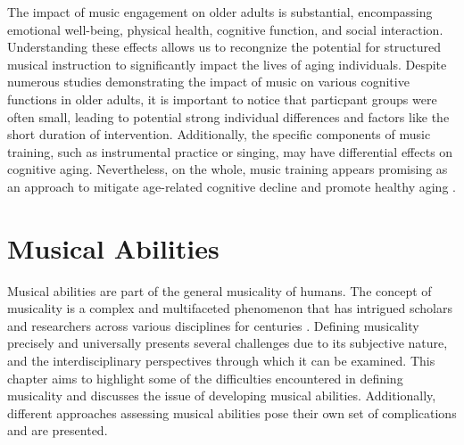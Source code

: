The impact of music engagement on older adults is substantial, encompassing emotional well-being, physical health, cognitive function, and social interaction. Understanding these effects allows us to recongnize the potential for structured musical instruction to significantly impact the lives of aging individuals. Despite numerous studies demonstrating the impact of music on various cognitive functions in older adults, it is important to notice that particpant groups were often small, leading to potential strong individual differences and factors like the short duration of intervention. Additionally, the specific components of music training, such as instrumental practice or singing, may have differential effects on cognitive aging. Nevertheless, on the whole, music training appears promising as an approach to mitigate age-related cognitive decline and promote healthy aging \cite{Klimova2017}.

\section{Musical Abilities}
Musical abilities are part of the general musicality of humans. The concept of musicality is a complex and multifaceted phenomenon that has intrigued scholars and researchers across various disciplines for centuries \cite{Gembris1987, Pausch2022, Roman-Caballero2018}. Defining musicality precisely and universally presents several challenges due to its subjective nature, and the interdisciplinary perspectives through which it can be examined.  This chapter aims to highlight some of the difficulties encountered in defining musicality and discusses the issue of developing musical abilities. Additionally, different approaches assessing musical abilities pose their own set of complications and are presented.

